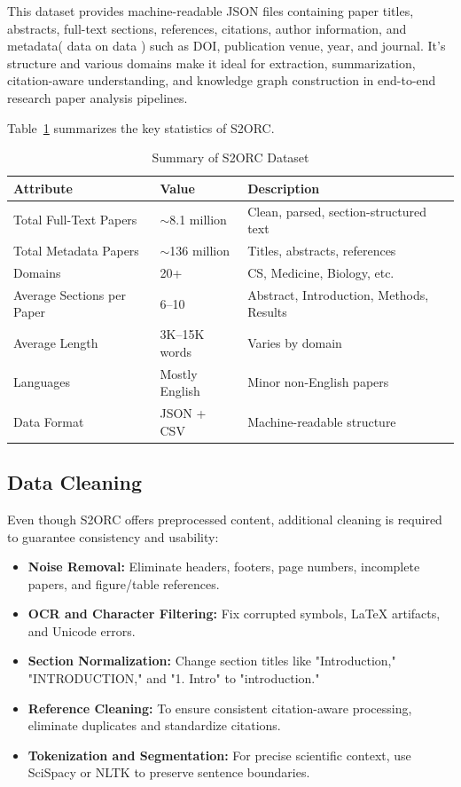 \documentclass[conference]{IEEEtran}
\begin{document}
This dataset provides machine-readable JSON files containing paper titles, abstracts, full-text sections, references, 
citations, author information, and metadata( data on data ) such as DOI, publication venue, year, and journal. It's structure and various domains make it ideal for extraction, summarization, citation-aware understanding, and knowledge graph construction in end-to-end research paper analysis pipelines.

Table~\ref{tab:s2orc_stats} summarizes the key statistics of S2ORC.

\begin{table}[h]
\centering
\caption{Summary of S2ORC Dataset}
\label{tab:s2orc_stats}
\begin{tabular}{|l|l|p{3.2cm}|}
\hline
\textbf{Attribute} & \textbf{Value} & \textbf{Description} \\ \hline
Total Full-Text Papers & $\sim$8.1 million & Clean, parsed, section-structured text \\ \hline
Total Metadata Papers & $\sim$136 million & Titles, abstracts, references \\ \hline
Domains & 20+ & CS, Medicine, Biology, etc. \\ \hline
Average Sections per Paper & 6--10 & Abstract, Introduction, Methods, Results \\ \hline
Average Length & 3K--15K words & Varies by domain \\ \hline
Languages & Mostly English & Minor non-English papers \\ \hline
Data Format & JSON + CSV & Machine-readable structure \\ \hline
\end{tabular}
\end{table}

\subsection{Data Cleaning}

Even though S2ORC offers preprocessed content, additional cleaning is required to guarantee consistency and usability:

\begin{itemize}
\item \textbf{Noise Removal:} Eliminate headers, footers, page numbers, incomplete papers, and figure/table references.
\item \textbf{OCR and Character Filtering:} Fix corrupted symbols, LaTeX artifacts, and Unicode errors.
\item \textbf{Section Normalization:} Change section titles like "Introduction," "INTRODUCTION," and "1. Intro" to "introduction."
\item \textbf{Reference Cleaning:} To ensure consistent citation-aware processing, eliminate duplicates and standardize citations.
\item \textbf{Tokenization and Segmentation:} For precise scientific context, use SciSpacy or NLTK to preserve sentence boundaries.
\end{itemize}
\end{document}
